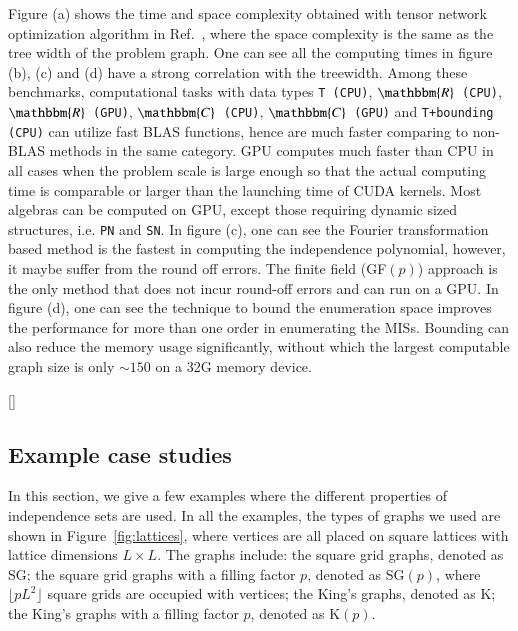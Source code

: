 \documentclass[onefignum, onetabnum]{siamart190516}
\newcommand{\<}{\langle}
\renewcommand{\>}{\rangle}
\newcommand{\Fig}[1]{Fig.~\ref{#1}}
\newcommand{\blue}[1]{[{\bf  \color{blue}{JG: #1}}]}
\newcounter{example}
\begin{document}
Figure (a) shows the time and space complexity obtained with tensor network optimization algorithm in Ref.~\cite{Kalachev2021}, where the space complexity is the same as the tree width of the problem graph.
One can see all the computing times in figure (b), (c) and (d) have a strong correlation with the treewidth.
Among these benchmarks, computational tasks with data types \texttt{T (CPU)},
\texttt{$\mathbbm{R}$ (CPU)}, \texttt{$\mathbbm{R}$ (GPU)}, \texttt{$\mathbbm{C}$ (CPU)}, \texttt{$\mathbbm{C}$ (GPU)} and \texttt{T+bounding (CPU)} can utilize fast BLAS functions, hence 
are much faster comparing to non-BLAS methods in the same category.
GPU computes much faster than CPU in all cases when the problem scale is large enough so that the actual computing time is comparable or larger than the launching time of CUDA kernels.
Most algebras can be computed on GPU, except those requiring dynamic sized structures, i.e. \texttt{PN} and \texttt{SN}.
In figure (c), one can see the Fourier transformation based method is the fastest in computing the independence polynomial,
however, it maybe suffer from the round off errors. The finite field (GF$(p)$) approach is the only method that does not incur round-off errors and can run on a GPU.
In figure (d), one can see the technique to bound the enumeration space improves the performance for more than one order in enumerating the MISs.
Bounding can also reduce the memory usage significantly, without which the largest computable graph size is only $\sim150$ on a 32G memory device.

\blue{I am here!}

\subsection{Example case studies} In this section, we give a few examples where the different properties of independence sets are used.
In all the examples, the types of graphs we used are shown in Figure~\ref{fig:lattices}, where vertices are all placed on square lattices with lattice dimensions $L \times L$.
The graphs include: the square grid graphs, denoted as SG; the square grid graphs with a filling factor $p$, denoted as SG$(p)$, where $\lfloor pL^{2} \rfloor$ square grids are occupied with vertices;
the King's graphs, denoted as K; the King's graphs with a filling factor $p$, denoted as K$(p)$. 
\end{document}
